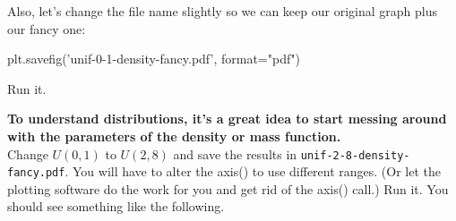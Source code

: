 \begin{fullwidth}
\step Also, let's change the file name slightly so we can keep our original graph plus our fancy one:

\begin{pyverbatim}
plt.savefig('unif-0-1-density-fancy.pdf', format="pdf")
\end{pyverbatim}

\step Run it. \\


{\bf To understand distributions, it's a great idea to start messing around with the parameters of the density or mass function.} \\

\step Change $U(0,1)$ to $U(2,8)$ and save the results in {\tt unif-2-8-density-fancy.pdf}. You will have to alter the axis() to use different ranges. (Or let the plotting software do the work for you and get rid of the axis() call.) Run it. You should see something like the following.



\end{fullwidth}
